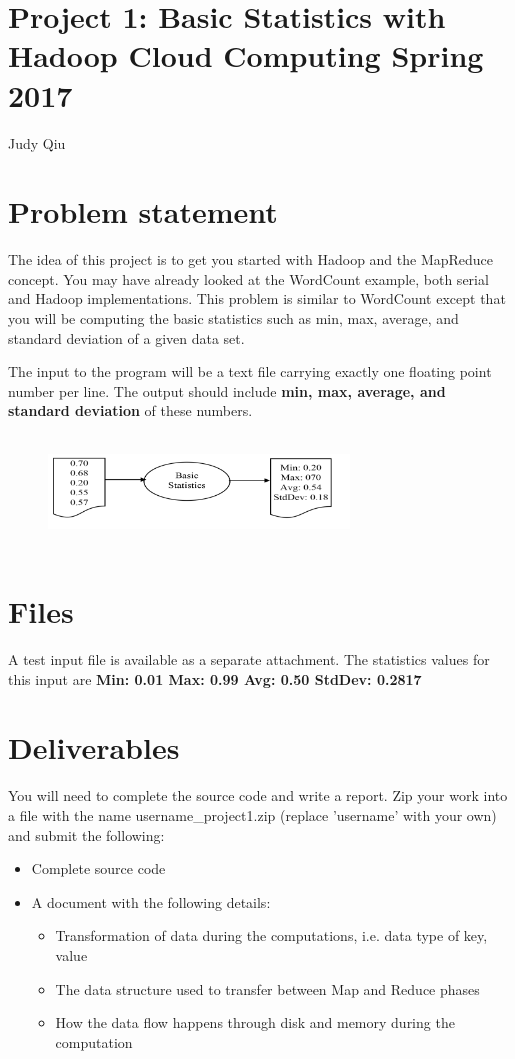 
\section{Project 1: Basic Statistics with Hadoop Cloud Computing
  Spring 2017}       

Judy Qiu

\section*{Problem statement}
 
The idea of this project is to get you started with Hadoop and the MapReduce concept. You may have already looked at the WordCount example, both serial and Hadoop implementations. This problem is similar to WordCount except that you will be computing the basic statistics such as min, max, average, and standard deviation of a given data set.

The input to the program will be a text file carrying exactly one floating point number per line. The output should include \textbf{min, max, average, and standard deviation} of these numbers.

\begin{figure}[!htbp]
\includegraphics[width=8cm,height=3cm]{section/icloud/assignment/problems/project1/p1example.png}
\centering
\end{figure}

\section*{Files}
A test input file is available as a separate attachment.
The statistics values for this input are \textbf{Min: 0.01 Max: 0.99 Avg: 0.50 StdDev: 0.2817}


\section*{Deliverables}
You will need to complete the source code and write a report. Zip your work into a file with the name username\_project1.zip (replace 'username' with your own) and submit the following:
\begin{itemize}
\item Complete source code
\item A document with the following details:
\begin{itemize}
\item	Transformation of data during the computations, i.e. data type of key, value
\item	The data structure used to transfer between Map and Reduce phases
\item	How the data flow happens through disk and memory during the computation
\end{itemize}
\end{itemize}

